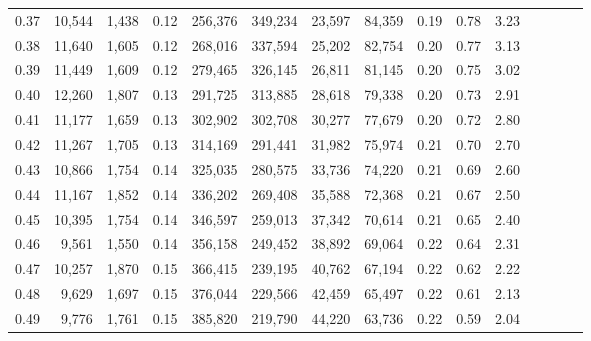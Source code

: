 \begin{tabular}{rrrcrrrrrrrrrrr}
0.37 &  10,544 &  1,438 &                                       0.12 &  256,376 &  349,234 &   23,597 &   84,359 &  0.19 &  0.78 &                         3.23 \\
0.38 &  11,640 &  1,605 &                                       0.12 &  268,016 &  337,594 &   25,202 &   82,754 &  0.20 &  0.77 &                         3.13 \\
0.39 &  11,449 &  1,609 &                                       0.12 &  279,465 &  326,145 &   26,811 &   81,145 &  0.20 &  0.75 &                         3.02 \\
0.40 &  12,260 &  1,807 &                                       0.13 &  291,725 &  313,885 &   28,618 &   79,338 &  0.20 &  0.73 &                         2.91 \\
0.41 &  11,177 &  1,659 &                                       0.13 &  302,902 &  302,708 &   30,277 &   77,679 &  0.20 &  0.72 &                         2.80 \\
0.42 &  11,267 &  1,705 &                                       0.13 &  314,169 &  291,441 &   31,982 &   75,974 &  0.21 &  0.70 &                         2.70 \\
0.43 &  10,866 &  1,754 &                                       0.14 &  325,035 &  280,575 &   33,736 &   74,220 &  0.21 &  0.69 &                         2.60 \\
0.44 &  11,167 &  1,852 &                                       0.14 &  336,202 &  269,408 &   35,588 &   72,368 &  0.21 &  0.67 &                         2.50 \\
0.45 &  10,395 &  1,754 &                                       0.14 &  346,597 &  259,013 &   37,342 &   70,614 &  0.21 &  0.65 &                         2.40 \\
0.46 &   9,561 &  1,550 &                                       0.14 &  356,158 &  249,452 &   38,892 &   69,064 &  0.22 &  0.64 &                         2.31 \\
0.47 &  10,257 &  1,870 &                                       0.15 &  366,415 &  239,195 &   40,762 &   67,194 &  0.22 &  0.62 &                         2.22 \\
0.48 &   9,629 &  1,697 &                                       0.15 &  376,044 &  229,566 &   42,459 &   65,497 &  0.22 &  0.61 &                         2.13 \\
0.49 &   9,776 &  1,761 &                                       0.15 &  385,820 &  219,790 &   44,220 &   63,736 &  0.22 &  0.59 &                         2.04 \\

\end{tabular}
